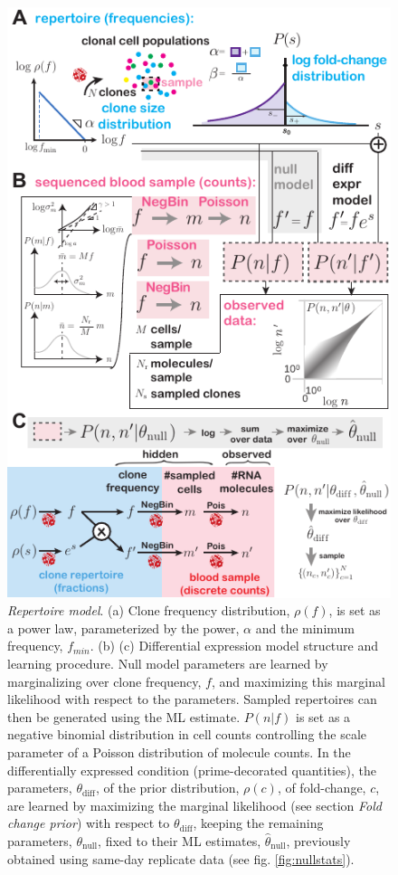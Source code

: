 \documentclass[letterpaper,english,prl,reprint,longbibliography]{revtex4-1} %
\begin{document}
\begin{figure}[ht!]
\includegraphics{fig1_nullmodel_v3}
\centering{}
\caption{
\emph{Repertoire model}. 
(a) Clone frequency distribution, $\rho(f)$, is set as a power law, parameterized by the power, $\alpha$ and the minimum frequency, $f_{min}$.
(b)
(c) Differential expression model structure and learning procedure. Null model parameters are learned by marginalizing over clone frequency, $f$, and maximizing this marginal likelihood with respect to the parameters. Sampled repertoires can then be generated using the ML estimate. $P(n|f)$ is set as a negative binomial distribution in cell counts controlling the scale parameter of a Poisson distribution of molecule counts. In the differentially expressed condition (prime-decorated quantities), the parameters, $\theta_{\textrm{diff}}$, of the prior distribution, $\rho(c)$, of fold-change, $c$, are learned by maximizing the marginal likelihood (see section \textit{Fold change prior}) with respect to $\theta_{\textrm{diff}}$, keeping the remaining parameters, $\theta_{\textrm{null}}$, fixed to their ML estimates, $\hat{\theta}_{\textrm{null}}$, previously obtained using same-day replicate data (see fig. \ref{fig:nullstats}).
\label{fig:fullmodel}}
\end{figure}
\end{document}
